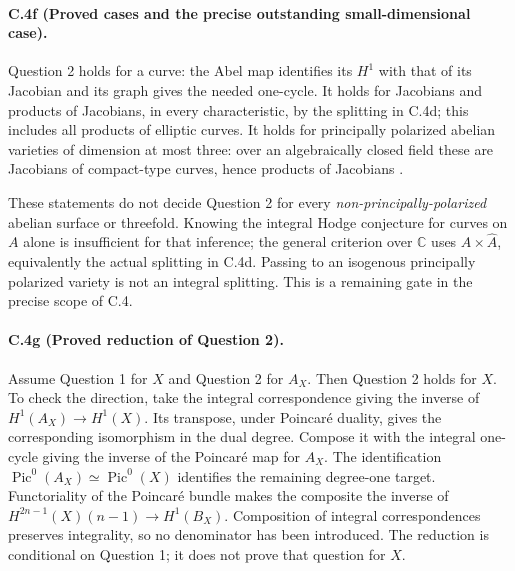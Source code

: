 \paragraph{C.4f (Proved cases and the precise outstanding small-dimensional case).}
Question 2 holds for a curve: the Abel map identifies its $H^1$ with
that of its Jacobian and its graph gives the needed one-cycle.
It holds for Jacobians and products of Jacobians, in every
characteristic, by the splitting in C.4d; this includes all products
of elliptic curves. It holds for principally polarized abelian
varieties of dimension at most three: over an algebraically closed
field these are Jacobians of compact-type curves, hence products of
Jacobians \citep[Theorem 4]{cyOortUeno1973}.

These statements do not decide Question 2 for every
\emph{non-principally-polarized} abelian surface or threefold.
Knowing the integral Hodge conjecture for curves on $A$ alone is
insufficient for that inference; the general criterion over
$\mathbb C$ uses $A\times\widehat A$, equivalently the actual splitting
in C.4d. Passing to an isogenous principally polarized variety is not
an integral splitting. This is a remaining gate in the precise scope
of C.4.

\paragraph{C.4g (Proved reduction of Question 2).}
Assume Question 1 for $X$ and Question 2 for $A_X$. Then Question 2
holds for $X$. To check the direction, take the integral
correspondence giving the inverse of
$H^1(A_X)\to H^1(X)$. Its transpose, under Poincar\'e duality, gives
the corresponding isomorphism in the dual degree. Compose it with
the integral one-cycle giving the inverse of the Poincar\'e map for
$A_X$. The identification
$\operatorname{Pic}^0(A_X)\simeq\operatorname{Pic}^0(X)$ identifies
the remaining degree-one target. Functoriality of the Poincar\'e
bundle makes the composite the inverse of
$H^{2n-1}(X)(n-1)\to H^1(B_X)$. Composition of integral
correspondences preserves integrality, so no denominator has been
introduced. The reduction is conditional on Question 1; it does not
prove that question for $X$.









